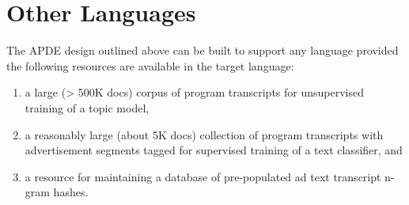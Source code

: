 \documentclass[sigchi]{acmart}
\begin{document}
\section{Other Languages}

The APDE design outlined above can be built to support any language provided the following resources are available in the target language:

\begin{enumerate}
	\item a large (> 500K docs) corpus of program transcripts for unsupervised training of a topic model,
	\item a reasonably large (about 5K docs) collection of program transcripts with advertisement segments tagged for supervised training of a text classifier, and
	\item a resource for maintaining a database of pre-populated ad text transcript n-gram hashes.
\end{enumerate}



\nocite{*}

\end{document}
